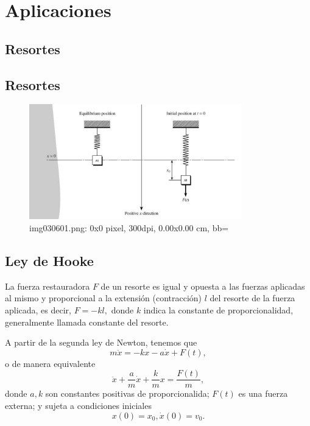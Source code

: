  \section{Aplicaciones}

\subsection{Resortes}


\subsection{Resortes}
\begin{figure}
	\centering
	\includegraphics[height=5cm,keepaspectratio=true]{./edo/img030601.png}
	img030601.png: 0x0 pixel, 300dpi, 0.00x0.00 cm, bb=
	\label{fig:030601}
\end{figure}




\subsection{Ley de Hooke}
La fuerza restauradora $F$ de un resorte es igual y opuesta a las fuerzas aplicadas al mismo y proporcional a la extensi\'on (contracci\'on) $l$ del resorte de la fuerza aplicada, es decir, $F=-kl,$ donde $k$ indica la constante de proporcionalidad, generalmente llamada constante del resorte.



A partir de la segunda ley de Newton, tenemos que $$m\ddot{x}=-kx-a\dot{x}+F(t),$$ o de manera equivalente
\begin{equation}
	\label{bron:14.1}
	\ddot{x}+\dfrac{a}{m}\dot{x}+\dfrac{k}{m}x=\dfrac{F(t)}{m},
\end{equation}
donde $a,k$ son constantes positivas de proporcionalida; $F(t)$ es una fuerza externa; y sujeta a condiciones iniciales
\begin{equation}
	\label{bron:14.2}
	x(0)=x_{0}, \dot{x}(0)=v_{0}.
\end{equation}




